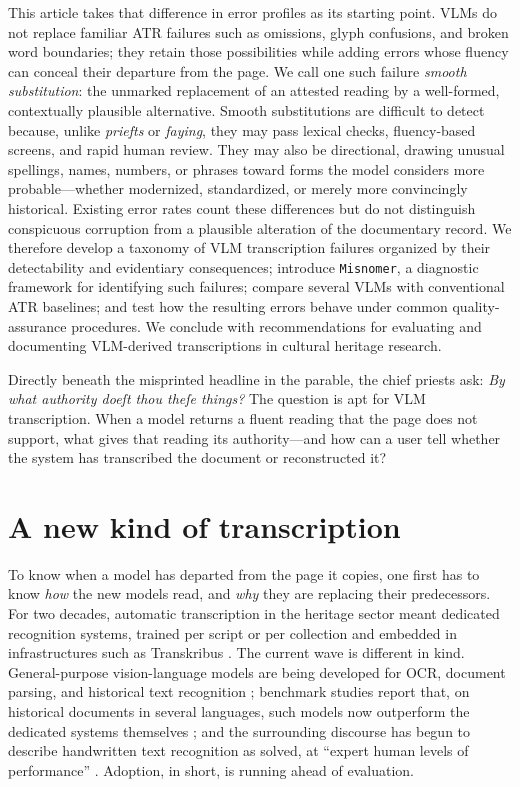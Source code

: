 \documentclass{anthology-ch}         %
\begin{document}
This article takes that difference in error profiles as its starting point. VLMs do not replace familiar ATR failures such as omissions, glyph confusions, and broken word boundaries; they retain those possibilities while adding errors whose fluency can conceal their departure from the page. We call one such failure \emph{smooth substitution}: the unmarked replacement of an attested reading by a well-formed, contextually plausible alternative. Smooth substitutions are difficult to detect because, unlike \emph{priefts} or \emph{faying}, they may pass lexical checks, fluency-based screens, and rapid human review. They may also be directional, drawing unusual spellings, names, numbers, or phrases toward forms the model considers more probable---whether modernized, standardized, or merely more convincingly historical. Existing error rates count these differences but do not distinguish conspicuous corruption from a plausible alteration of the documentary record. We therefore develop a taxonomy of VLM transcription failures organized by their detectability and evidentiary consequences; introduce \texttt{Misnomer}, a diagnostic framework for identifying such failures; compare several VLMs with conventional ATR baselines; and test how the resulting errors behave under common quality-assurance procedures. We conclude with recommendations for evaluating and documenting VLM-derived transcriptions in cultural heritage research.

Directly beneath the misprinted headline in the parable, the chief priests ask: \emph{By what authority doeſt thou theſe things?} The question is apt for VLM transcription. When a model returns a fluent reading that the page does not support, what gives that reading its authority---and how can a user tell whether the system has transcribed the document or reconstructed it?

\section{A new kind of transcription}\label{sec:new_kind}

To know when a model has departed from the page it copies, one first has to know \emph{how} the new models read, and \emph{why} they are replacing their predecessors. For two decades, automatic transcription in the heritage sector meant dedicated recognition systems, trained per script or per collection and embedded in infrastructures such as Transkribus \cite{muehlberger_transforming_2019, nockels_understanding_2022}. The current wave is different in kind. General-purpose vision-language models are being developed for OCR, document parsing, and historical text recognition \cite{wei_general_2024, poznanski_olmocr_2025, cui_paddleocr-vl_2025, semnani_churro_2025}; benchmark studies report that, on historical documents in several languages, such models now outperform the dedicated systems themselves \cite{humphries_unlocking_2025, crosilla_benchmarking_2025}; and the surrounding discourse has begun to describe handwritten text recognition as solved, at ``expert human levels of performance'' \cite{humphries_gemini_2025}. Adoption, in short, is running ahead of evaluation.
\end{document}

